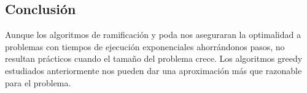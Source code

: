 \subsection{Conclusión}
Aunque los algoritmos de ramificación y poda nos aseguraran la optimalidad a problemas con
tiempos de ejecución exponenciales ahorrándonos pasos, no resultan prácticos cuando el tamaño
del problema crece. Los algoritmos greedy estudiados anteriormente nos pueden dar una aproximación
más que razonable para el problema.